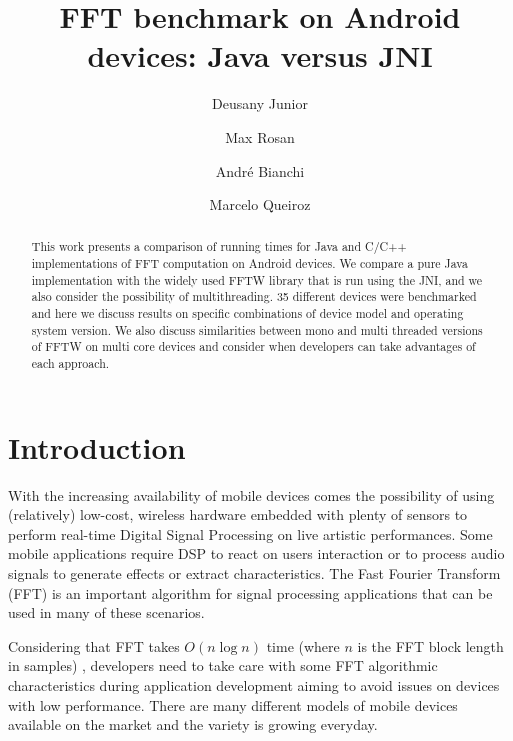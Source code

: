 \documentclass[12pt]{article}
\title{FFT benchmark on Android devices: Java versus JNI}
\author{Deusany Junior\inst{1} \and Max Rosan\inst{1} \and André
Bianchi\inst{1} \and Marcelo Queiroz\inst{1}}
\begin{document}
\maketitle

\begin{abstract}

This work presents a comparison of running times for Java and C/C++
implementations of FFT computation on Android devices. We compare a pure Java
implementation with the widely used FFTW library that is run using the JNI,
and we also consider the possibility of multithreading. 35 different devices
were benchmarked and here we discuss results on specific combinations of
device model and operating system version. We also discuss similarities
between mono and multi threaded  versions of FFTW on multi core devices and
consider when developers can take advantages of each approach.

\end{abstract}


\section{Introduction}

With  the increasing availability of mobile devices comes the possibility of
using (relatively) low-cost, wireless hardware embedded with plenty of sensors
to perform real-time Digital Signal Processing on live artistic performances.
Some mobile applications require DSP to react on users interaction or to
process audio signals to generate effects or extract characteristics.
The Fast Fourier Transform (FFT) is an important algorithm for signal
processing applications that can be used in many of these scenarios.

Considering that FFT takes $O(n\log{n})$ time (where $n$ is the FFT block
length in samples) \citep{CooleyTukey}, developers need to take care with some
FFT algorithmic characteristics during application development aiming to avoid
issues on devices with low performance. There are many different models of
mobile devices available on the market and the variety is growing everyday.
\end{document}
